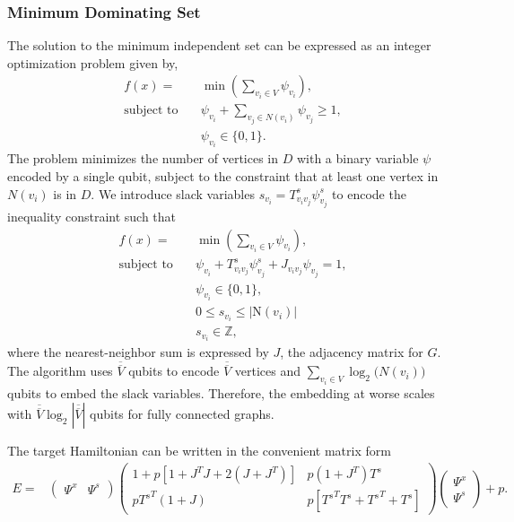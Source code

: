 \documentclass[fleqn,10pt]{wlscirep}
\begin{document}
\subsubsection{Minimum Dominating Set}
The solution to the minimum independent set can be expressed as an integer optimization problem given by,
\begin{align}
f(x) = &\min(\sum_{v_i\in V} \psi_{v_i}),\\
\textrm{subject to} \quad & \psi_{v_i} + \sum_{v_j \in \mathit{N}(v_i)} \psi_{v_j} \geq 1,\\
& \psi_{v_i} \in \{0, 1\}.
\end{align}
The problem minimizes the number of vertices in $D$ with a binary variable $\psi$ encoded by a single qubit, subject to the constraint that at least one vertex in $\mathit{N}(v_i)$ is in $D$. We introduce slack variables $s_{v_i} = T^s_{v_i v_j} \psi^s_{v_j}$ to encode the inequality constraint such that
\begin{align}
f(x) = &\min(\sum_{v_i\in V} \psi_{v_i}),\\
\textrm{subject to} \quad & \psi_{v_i} + T^s_{v_i v_j} \psi^s_{v_j} + J_{v_i v_j} \psi_{v_j} = 1,\\
& \psi_{v_i} \in \{0, 1\},\\
& 0 \leq s_{v_i} \leq |\mathrm{N}(v_i)|\\
& s_{v_i} \in \mathbb{Z},
\end{align}
where the nearest-neighbor sum is expressed by $J$, the adjacency matrix for $G$. The algorithm uses $\overline{\overline{V}}$ qubits to encode $\overline{\overline{V}}$ vertices and $\sum_{v_i \in V} \log_2 \mathit(N(v_i))$ qubits to embed the slack variables. Therefore, the embedding at worse scales with $\overline{\overline{V}} \log_2 |\overline{\overline{V}}|$ qubits for fully connected graphs.

The target Hamiltonian can be written in the convenient matrix form
\begin{align}
E = &
\begin{pmatrix}
\Psi^x & \Psi^s
\end{pmatrix}
\begin{pmatrix}
1 + p\left[1+J^T J + 2(J+J^T)\right] &p(1+J^T)T^s\\
p{T^s}^T(1+J)& p\left[{T^s}^T T^s + {T^s}^T + T^s\right]
\end{pmatrix}
\begin{pmatrix}
\Psi^x\\ \Psi^s
\end{pmatrix} + p.
\label{eq:matrix_form}
\end{align}
\end{document}
